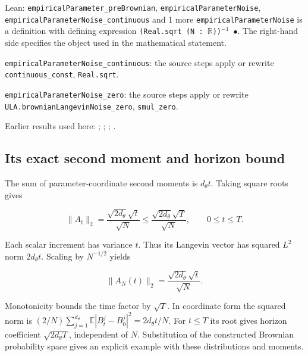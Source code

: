 \documentclass[11pt,a4paper]{report}
\begin{document}
\begin{leanbox}{Lean: \texttt{empiricalParameter\_\allowbreak{}preBrownian}, \texttt{empiricalParameterNoise}, \texttt{empiricalParameterNoise\_\allowbreak{}continuous} and 1 more}
\texttt{empirical\allowbreak{}Parameter\allowbreak{}Noise} is a definition with defining expression \texttt{(Real.\allowbreak{}sqrt (N : \ensuremath{\mathbb R}))\ensuremath{{}^{-1}} \ensuremath{\bullet}}. The right-hand side specifies the object used in the mathematical statement.



\texttt{empirical\allowbreak{}Parameter\allowbreak{}Noise\_\allowbreak{}continuous}: the source steps apply or rewrite \texttt{continuous\_\allowbreak{}const}, \texttt{Real.\allowbreak{}sqrt}.



\texttt{empirical\allowbreak{}Parameter\allowbreak{}Noise\_\allowbreak{}zero}: the source steps apply or rewrite \texttt{ULA.\allowbreak{}brownian\allowbreak{}Langevin\allowbreak{}Noise\_\allowbreak{}zero}, \texttt{smul\_\allowbreak{}zero}.
\end{leanbox}


Earlier results used here: \cite[Section~3.25.1]{LangevinLean2026ULASC}; \cite[Section~3.25.2]{LangevinLean2026ULASC}; \cite[Section~3.25.3]{LangevinLean2026ULASC}; \cite[Section~3.32.1]{LangevinLean2026ULASC}.
\subsection{\texorpdfstring{Its exact second moment and horizon bound}{Its exact second moment and horizon bound}}
\label{report-step-ProximalLangevin-MeanFieldNoise-lean-2}


The sum of parameter-coordinate second moments is \(d_\theta t\). Taking square roots gives

\[\|A_t\|_2=\frac{\sqrt{2d_\theta}\sqrt t}{\sqrt N}\le\frac{\sqrt{2d_\theta}\sqrt T}{\sqrt N},\qquad0\le t\le T.\]

Each scalar increment has variance \(t\). Thus its Langevin vector has squared \(L^2\) norm \(2d_\theta t\). Scaling by \(N^{-1/2}\) yields

\[\|A_N(t)\|_2=\frac{\sqrt{2d_\theta}\sqrt t}{\sqrt N}.\]

Monotonicity bounds the time factor by \(\sqrt T\). In coordinate form the squared norm is \((2/N)\sum_{j=1}^{d_\theta}\mathbb E|B_t^j-B_0^j|^2=2d_\theta t/N\). For \(t\le T\) its root gives horizon coefficient \(\sqrt{2d_\theta T}\), independent of \(N\). Substitution of the constructed Brownian probability space gives an explicit example with these distributions and moments.
\end{document}
